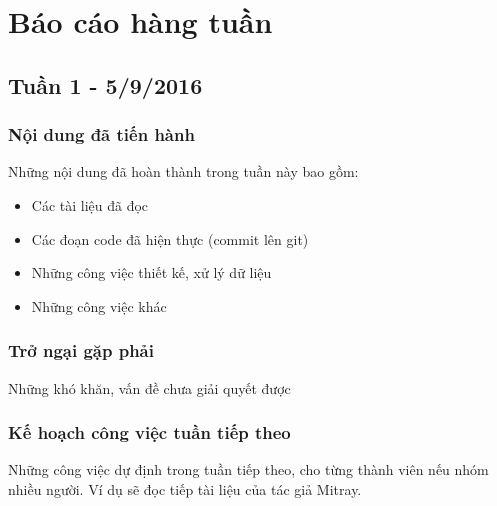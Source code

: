 \chapter{Báo cáo hàng tuần}
\section{Tuần 1 - 5/9/2016}
\subsection{Nội dung đã tiến hành}
Những nội dung đã hoàn thành trong tuần này bao gồm:
\begin{itemize}
\item Các tài liệu đã đọc 
\item Các đoạn code đã hiện thực (commit lên git)
\item Những công việc thiết kế, xử lý dữ liệu 
\item Những công việc khác
\end{itemize}

\subsection{Trở ngại gặp phải}
Những khó khăn, vấn đề chưa giải quyết được

\subsection{Kế hoạch công việc tuần tiếp theo}
Những công việc dự định trong tuần tiếp theo, cho từng thành viên nếu nhóm nhiều người. Ví dụ sẽ đọc tiếp tài liệu \cite{mitray1997automatic} của tác giả Mitray.

